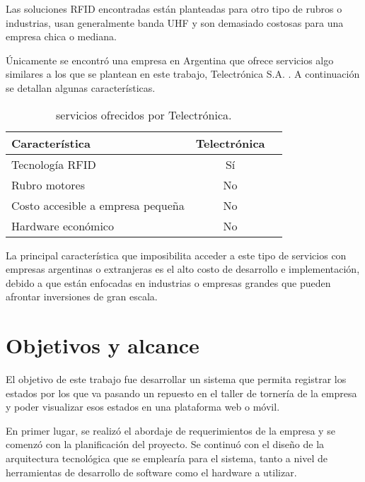 Las soluciones RFID encontradas están planteadas para otro tipo de rubros o industrias, usan generalmente banda UHF y son demasiado costosas para una empresa chica o mediana. 

Únicamente se encontró una empresa en Argentina que ofrece servicios algo similares a los que se plantean en este trabajo, Telectrónica S.A. \citep{WEBSITE:TELECTRONICA}. A continuación se detallan algunas características.

\begin{table}[h]
	\centering
	\caption[servicios estado del arte]{servicios ofrecidos por Telectrónica.}
	\begin{tabular}{l c c}    
		\toprule
		\textbf{Característica} 	 & \textbf{Telectrónica} 		  \\
		\midrule
		Tecnología RFID	 & Sí				 \\
		Rubro motores & No \\		
		Costo accesible a empresa pequeña	 & No				 \\
		Hardware económico	 & No				 \\
		\bottomrule
		\hline
	\end{tabular}
	\label{tab:peces}
\end{table}

La principal característica que imposibilita acceder a este tipo de servicios con empresas argentinas o extranjeras es el alto costo de desarrollo e implementación, debido a que están enfocadas en industrias o empresas grandes que pueden afrontar inversiones de gran escala.



\section{Objetivos y alcance}
\label{sec:objetivosyalcance}

El objetivo de este trabajo fue desarrollar un sistema que permita registrar los estados por los que va pasando un repuesto en el taller de tornería de la empresa y poder visualizar esos estados en una plataforma web o móvil. 

En primer lugar, se realizó el abordaje de requerimientos de la empresa y se comenzó con la planificación del proyecto. Se continuó con el diseño de la arquitectura tecnológica que se emplearía para el sistema, tanto a nivel de herramientas de desarrollo de software como el hardware a utilizar.

